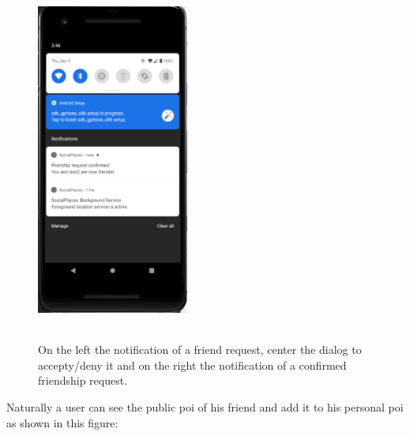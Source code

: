 \documentclass[../../main]{subfiles}
\begin{document}
\begin{figure}[H]
    \includegraphics[width=50mm,height=120mm]{images/app/notification/friend/confirmed_request.png}
    \caption{On the left the notification of a friend request, center the dialog to accepty/deny it and on the right the notification of a confirmed friendship request.}
\end{figure}
\newpage
Naturally a user can see the public poi of his friend and add it to his personal poi as shown in this figure:
\end{document}
